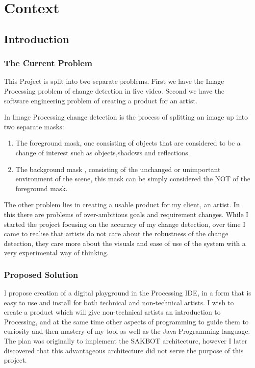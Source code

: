 \documentclass[a4paper]{report}
\begin{document}
\tableofcontents
\clearpage

\chapter{Context}
\section{Introduction}
\subsection{The Current Problem}
This Project is split into two separate problems. First we have the Image Processing problem of change detection in live video. Second we have the software engineering problem of creating a product for an artist.

In Image Processing change detection is the process of splitting an image up into two separate masks:
\begin{enumerate}
  \item The foreground mask, one consisting of objects that are considered to be a change of interest such as objects,shadows and reflections.
  \item The background mask , consisting of the unchanged or unimportant environment of the scene, this mask can be simply considered the NOT of the foreground mask.
\end{enumerate}

The other problem lies in creating a usable product for my client, an artist. In this there are problems of over-ambitious goals and requirement changes. While I started the project focusing on the accuracy of my change detection, over time I came to realise that artists do not care about the robustness of the change detection, they care more about the visuals and ease of use of the system with a very experimental way of thinking.

\subsection{Proposed Solution}
I propose creation of a digital playground in the Processing\cite{PROCESSING} IDE, in a form that is easy to use and install for both technical and non-technical artists. I wish to create a product which will give non-technical artists an introduction to Processing, and at the same time other aspects of programming to guide them to curiosity and then mastery of my tool as well as the Java Programming language. The plan was originally to implement the SAKBOT architecture\cite{SAKBOT}, however I later discovered that this advantageous architecture did not serve the purpose of this project.
\end{document}
